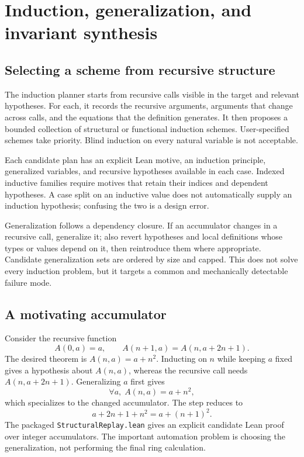 \documentclass[11pt,a4paper]{article}
\theoremstyle{definition}
\newcommand{\code}[1]{\texttt{#1}}
\begin{document}
\section{Induction, generalization, and invariant synthesis}

\subsection{Selecting a scheme from recursive structure}

The induction planner starts from recursive calls visible in the target and relevant hypotheses. For each, it records the recursive arguments, arguments that change across calls, and the equations that the definition generates. It then proposes a bounded collection of structural or functional induction schemes. User-specified schemes take priority. Blind induction on every natural variable is not acceptable.

Each candidate plan has an explicit Lean motive, an induction principle, generalized variables, and recursive hypotheses available in each case. Indexed inductive families require motives that retain their indices and dependent hypotheses. A case split on an inductive value does not automatically supply an induction hypothesis; confusing the two is a design error.

Generalization follows a dependency closure. If an accumulator changes in a recursive call, generalize it; also revert hypotheses and local definitions whose types or values depend on it, then reintroduce them where appropriate. Candidate generalization sets are ordered by size and capped. This does not solve every induction problem, but it targets a common and mechanically detectable failure mode.

\subsection{A motivating accumulator}

Consider the recursive function
\[
 A(0,a)=a,\qquad A(n+1,a)=A(n,a+2n+1).
\]
The desired theorem is $A(n,a)=a+n^2$. Inducting on $n$ while keeping $a$ fixed gives a hypothesis about $A(n,a)$, whereas the recursive call needs $A(n,a+2n+1)$. Generalizing $a$ first gives
\[
  \forall a,\;A(n,a)=a+n^2,
\]
which specializes to the changed accumulator. The step reduces to
\[
 a+2n+1+n^2=a+(n+1)^2.
\]
The packaged \code{StructuralReplay.lean} gives an explicit candidate Lean proof over integer accumulators. The important automation problem is choosing the generalization, not performing the final ring calculation.
\end{document}
